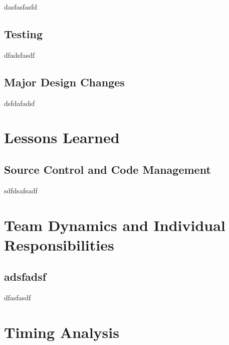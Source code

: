 \documentclass[12pt]{report}
\begin{document}
dasfasfasfd

\section{Testing}

dfadsfasdf

\section{Major Design Changes}

dsfdafadsf

\chapter{Lessons Learned}

\section{Source Control and Code Management}

sdfdsafsadf

\chapter{Team Dynamics and Individual Responsibilities}

\section{adsfadsf}

dfasfasdf

\chapter{Timing Analysis}
\end{document}
